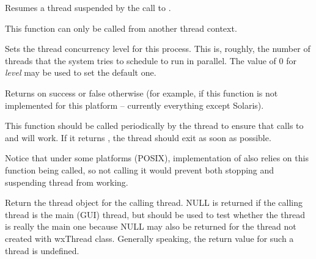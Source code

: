 \label{wxthreadresume}


Resumes a thread suspended by the call to .

This function can only be called from another thread context.


\label{wxthreadsetconcurrency}


Sets the thread concurrency level for this process. This is, roughly, the
number of threads that the system tries to schedule to run in parallel.
The value of $0$ for {\it level} may be used to set the default one.

Returns \true on success or false otherwise (for example, if this function is
not implemented for this platform -- currently everything except Solaris).


\label{wxthreadtestdestroy}


This function should be called periodically by the thread to ensure that calls
to  and  will
work. If it returns \true, the thread should exit as soon as possible.

Notice that under some platforms (POSIX), implementation of 
 also relies on this function being called, so
not calling it would prevent both stopping and suspending thread from working.


\label{wxthreadthis}


Return the thread object for the calling thread. NULL is returned if the calling thread
is the main (GUI) thread, but  should be used to test
whether the thread is really the main one because NULL may also be returned for the thread
not created with wxThread class. Generally speaking, the return value for such a thread
is undefined.


\label{wxthreadyield}


